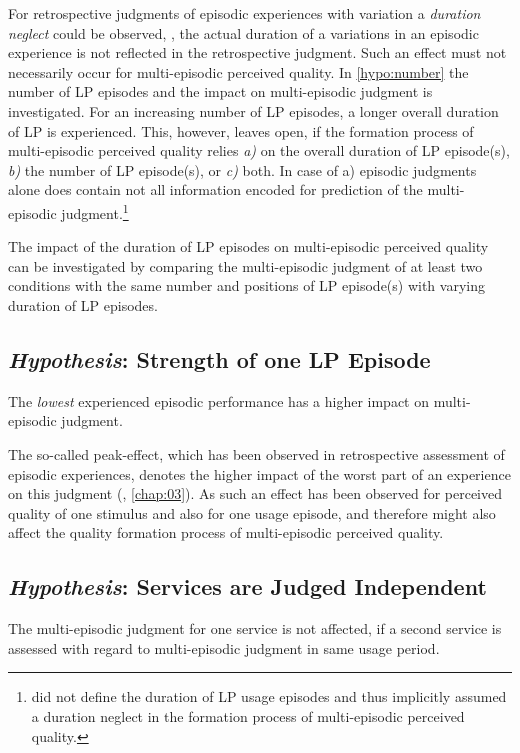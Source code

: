 For retrospective judgments of episodic experiences with variation a \emph{duration neglect} could be observed, \ie, the actual duration of a variations in an episodic experience is not reflected in the retrospective judgment.
Such an effect must not necessarily occur for multi-episodic perceived quality.
In \autoref{hypo:number} the number of \ac{LP} episodes and the impact on multi-episodic judgment is investigated.
For an increasing number of \ac{LP} episodes, a longer overall duration of \ac{LP} is experienced.
This, however, leaves open, if the formation process of multi-episodic perceived quality relies \emph{a)} on the overall duration of \ac{LP} episode(s), \emph{b)} the number of \ac{LP} episode(s), or \emph{c)} both.
In case of a) episodic judgments alone does contain not all information encoded for prediction of the multi-episodic judgment.\footnote{\cite[p. 2]{moller_single-call_2011} did not define the duration of \ac{LP} usage episodes and thus implicitly assumed a duration neglect in the formation process of multi-episodic perceived quality.}

The impact of the duration of \ac{LP} episodes on multi-episodic perceived quality can be investigated by comparing the multi-episodic judgment of at least two conditions with the same number and positions of \ac{LP} episode(s) with varying duration of \ac{LP} episodes.


\subsection{\emph{Hypothesis}: Strength of one \ac{LP} Episode}
\begin{hypothesis}\label{hypo:strength}
The \emph{lowest} experienced episodic performance has a higher impact on multi-episodic judgment.
\end{hypothesis}

The so-called peak-effect, which has been observed in retrospective assessment of episodic experiences, denotes the higher impact of the worst part of an experience on this judgment (\cf, \autoref{chap:03}).
As such an effect has been observed for perceived quality of one stimulus and also for one usage episode, and therefore might also affect the quality formation process of multi-episodic perceived quality.

\subsection{\emph{Hypothesis}: Services are Judged Independent}
\begin{hypothesis}\label{hypo:services}
The multi-episodic judgment for one service is not affected, if a second service is assessed with regard to multi-episodic judgment in same usage period.
\end{hypothesis}

